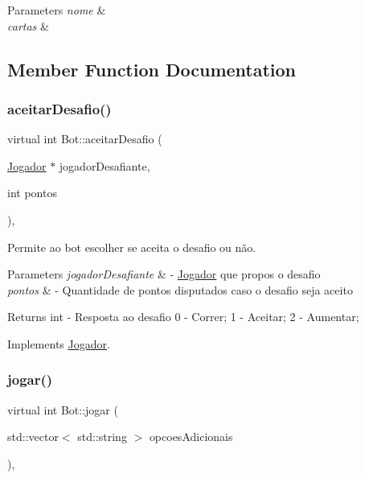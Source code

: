 \begin{DoxyParams}{Parameters}
{\em nome} & \\
\hline
{\em cartas} & \\
\hline
\end{DoxyParams}


\subsection{Member Function Documentation}
\mbox{\label{class_bot_a203bfaaa13441296a94dd157fc253631}} 
\subsubsection{\texorpdfstring{aceitarDesafio()}{aceitarDesafio()}}
{\footnotesize\ttfamily virtual int Bot\+::aceitar\+Desafio (\begin{DoxyParamCaption}\item[{\mbox{\hyperlink{class_jogador}{Jogador}} $\ast$}]{jogador\+Desafiante,  }\item[{int}]{pontos }\end{DoxyParamCaption})\hspace{0.3cm}{\ttfamily [override]}, {\ttfamily [virtual]}}



Permite ao bot escolher se aceita o desafio ou não. 


\begin{DoxyParams}{Parameters}
{\em jogador\+Desafiante} & -\/ \mbox{\hyperlink{class_jogador}{Jogador}} que propos o desafio \\
\hline
{\em pontos} & -\/ Quantidade de pontos disputados caso o desafio seja aceito \\
\hline
\end{DoxyParams}
\begin{DoxyReturn}{Returns}
int -\/ Resposta ao desafio 0 -\/ Correr; 1 -\/ Aceitar; 2 -\/ Aumentar; 
\end{DoxyReturn}


Implements \mbox{\hyperlink{class_jogador_a4eceb45cff559f97cd441da30d36769c}{Jogador}}.

\mbox{\label{class_bot_ab3d1a1563bada68fef705b2ca0af6386}} 
\subsubsection{\texorpdfstring{jogar()}{jogar()}}
{\footnotesize\ttfamily virtual int Bot\+::jogar (\begin{DoxyParamCaption}\item[{std\+::vector$<$ std\+::string $>$}]{opcoes\+Adicionais }\end{DoxyParamCaption})\hspace{0.3cm}{\ttfamily [override]}, {\ttfamily [virtual]}}



